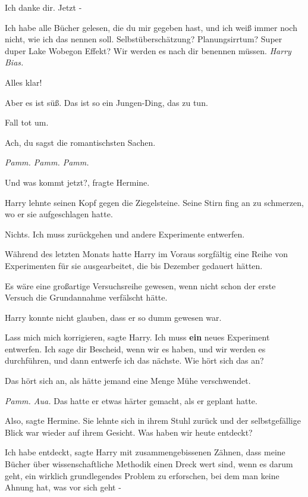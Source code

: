 \glqq{}Ich danke dir. Jetzt -\grqq{}

\glqq{}Ich habe alle Bücher gelesen, die du mir gegeben hast, und ich weiß immer
noch nicht, wie ich das nennen soll. Selbstüberschätzung? Planungsirrtum? Super
duper Lake Wobegon Effekt? Wir werden es nach dir benennen müssen. \emph{Harry
Bias.}\grqq{}

\glqq{}Alles klar!\grqq{}

\glqq{}Aber es ist süß. Das ist so ein Jungen-Ding, das zu tun.\grqq{}

\glqq{}Fall tot um.\grqq{}

\glqq{}Ach, du sagst die romantischsten Sachen.\grqq{}

\emph{Pamm. Pamm. Pamm.}

\glqq{}Und was kommt jetzt?\grqq{}, fragte Hermine.

Harry lehnte seinen Kopf gegen die Ziegelsteine. Seine Stirn fing an zu
schmerzen, wo er sie aufgeschlagen hatte.

\glqq{}Nichts. Ich muss zurückgehen und andere Experimente entwerfen.\grqq{}

Während des letzten Monats hatte Harry im Voraus sorgfältig eine Reihe von
Experimenten für sie ausgearbeitet, die bis Dezember gedauert hätten.

Es wäre eine großartige Versuchsreihe gewesen, wenn nicht schon der erste
Versuch die Grundannahme verfälscht hätte.

Harry konnte nicht glauben, dass er so dumm gewesen war.

\glqq{}Lass mich mich korrigieren\grqq{}, sagte Harry. \glqq{}Ich muss
\textbf{ein} neues Experiment entwerfen. Ich sage dir Bescheid, wenn wir es
haben, und wir werden es durchführen, und dann entwerfe ich das nächste. Wie
hört sich das an?\grqq{}

\glqq{}Das hört sich an, als hätte jemand eine Menge Mühe verschwendet.\grqq{}

\emph{Pamm. Aua.} Das hatte er etwas härter gemacht, als er geplant hatte.

\glqq{}Also\grqq{}, sagte Hermine. Sie lehnte sich in ihrem Stuhl zurück und der
selbstgefällige Blick war wieder auf ihrem Gesicht. \glqq{}Was haben wir heute
entdeckt?\grqq{}

\glqq{}Ich habe entdeckt\grqq{}, sagte Harry mit zusammengebissenen Zähnen,
\glqq{} dass meine Bücher über wissenschaftliche Methodik einen Dreck wert sind,
wenn es darum geht, ein wirklich grundlegendes Problem zu erforschen, bei dem
man keine Ahnung hat, was vor sich geht -\grqq{}


